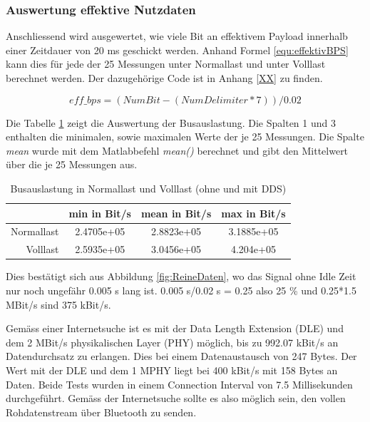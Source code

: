 \subsubsection{Auswertung effektive Nutzdaten}
Anschliessend wird ausgewertet, wie viele Bit an effektivem Payload innerhalb einer Zeitdauer von 20 ms geschickt werden. Anhand Formel \ref{equ:effektivBPS} kann dies  für jede der 25 Messungen unter Normallast und unter Volllast berechnet werden.  Der dazugehörige Code ist in Anhang \textcolor{red}{\ref{XX}} zu finden.

\begin{equation}
    eff\_bps = (NumBit - (NumDelimiter * 7)) / 0.02
    \label{equ:effektivBPS}
\end{equation}


 Die Tabelle \ref{tab:Busauslastung} zeigt die Auswertung  der Busauslastung. Die Spalten 1 und 3 enthalten die minimalen, sowie maximalen Werte der je 25 Messungen. Die Spalte \textit{mean} wurde mit dem Matlabbefehl \textit{mean()} berechnet und gibt den Mittelwert über die je 25 Messungen aus. 

\begin{table}[H]
    \centering
    \begin{tabular}{r|c|c|c}
        & min in Bit/s & mean in Bit/s & max in Bit/s\\ 
        \hline
        Normallast & 2.4705e+05 & 2.8823e+05 & 3.1885e+05\\
        \hline
        Volllast & 2.5935e+05 & 3.0456e+05 & 4.204e+05 \\
    \end{tabular}
    \caption{Busauslastung in Normallast und Volllast (ohne und mit DDS) }
    \label{tab:Busauslastung}
\end{table}

Dies bestätigt sich aus Abbildung \ref{fig:ReineDaten}, wo das Signal ohne Idle Zeit nur noch ungefähr 0.005 s lang ist. 0.005 s/0.02 s = 0.25  also 25 \% und 0.25*1.5 MBit/s sind 375 kBit/s. 

Gemäss einer Internetsuche ist es mit der Data Length Extension (DLE) und dem 2 MBit/s physikalischen Layer (PHY) möglich, bis zu 992.07 kBit/s an Datendurchsatz zu erlangen. Dies bei einem Datenaustausch von 247 Bytes. Der Wert mit der DLE und dem 1 MPHY liegt bei 400 kBit/s mit 158 Bytes an Daten. Beide Tests wurden in einem Connection Interval von 7.5 Millisekunden durchgeführt. 
Gemäss der Internetsuche sollte es also möglich sein, den vollen Rohdatenstream über Bluetooth zu senden. 

